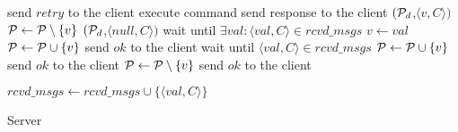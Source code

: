 \begin{algorithm}[t!]
\small

\begin{distribalgo}[1]

\vspace{1.0mm}

	\vspace{1.0mm}
	\vspace{1.0mm}

			\STATE send $retry$ to the client
		\ELSE
			\STATE execute command
			\STATE send response to the client
		\ENDIF
	\ENDINDENT
        \vspace{1.0mm}
				\STATE \rmcast$(\mathcal{P}_d$,$\langle v, C \rangle)$
				\STATE $\mathcal{P} \leftarrow \mathcal{P} \setminus \{v\}$
			\ELSE
				\STATE \rmcast$(\mathcal{P}_d$,$\langle null, C \rangle)$
			\ENDIF
		\ELSE
			\STATE wait until $\exists val : \langle val, C \rangle \in rcvd\_msgs$
				\STATE $v \leftarrow val$
				\STATE $\mathcal{P} \leftarrow \mathcal{P} \cup \{v\}$
			\ENDIF
			\STATE send $ok$ to the client
		\ENDIF
        	\ENDINDENT
	\vspace{1.0mm}
		\STATE wait until $\langle val, C \rangle \in rcvd\_msgs$
		\STATE $\mathcal{P} \leftarrow \mathcal{P} \cup \{v\}$
		\STATE send $ok$ to the client
        	\ENDINDENT
	\vspace{1.0mm}
                \STATE $\mathcal{P} \leftarrow \mathcal{P} \setminus \{v\}$
                \STATE send $ok$ to the client
        	\ENDINDENT
\ENDINDENT

    \vspace{1.0mm}

        \STATE $rcvd\_msgs \leftarrow rcvd\_msgs \cup \{\langle val, C \rangle\}$
    \ENDINDENT

\ENDINDENT

\caption{Server}
\label{alg:server_proxy}
\end{distribalgo}
\end{algorithm}